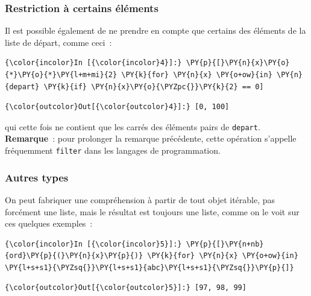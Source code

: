     \hypertarget{restriction-uxe0-certains-uxe9luxe9ments}{%
\subsubsection{Restriction à certains
éléments}\label{restriction-uxe0-certains-uxe9luxe9ments}}

    Il est possible également de ne prendre en compte que certains des
éléments de la liste de départ, comme ceci~:

    \begin{Verbatim}[commandchars=\\\{\}]
{\color{incolor}In [{\color{incolor}4}]:} \PY{p}{[}\PY{n}{x}\PY{o}{*}\PY{o}{*}\PY{l+m+mi}{2} \PY{k}{for} \PY{n}{x} \PY{o+ow}{in} \PY{n}{depart} \PY{k}{if} \PY{n}{x}\PY{o}{\PYZpc{}}\PY{k}{2} == 0]
\end{Verbatim}


\begin{Verbatim}[commandchars=\\\{\}]
{\color{outcolor}Out[{\color{outcolor}4}]:} [0, 100]
\end{Verbatim}
            
    qui cette fois ne contient que les carrés des éléments pairs de
\texttt{depart}.\\

    \textbf{Remarque}~: pour prolonger la remarque précédente, cette
opération s'appelle fréquemment \texttt{filter} dans les langages de
programmation.

    \hypertarget{autres-types}{%
\subsubsection{Autres types}\label{autres-types}}

    On peut fabriquer une compréhension à partir de tout objet itérable, pas
forcément une liste, mais le résultat est toujours une liste, comme on
le voit sur ces quelques exemples~:

    \begin{Verbatim}[commandchars=\\\{\}]
{\color{incolor}In [{\color{incolor}5}]:} \PY{p}{[}\PY{n+nb}{ord}\PY{p}{(}\PY{n}{x}\PY{p}{)} \PY{k}{for} \PY{n}{x} \PY{o+ow}{in} \PY{l+s+s1}{\PYZsq{}}\PY{l+s+s1}{abc}\PY{l+s+s1}{\PYZsq{}}\PY{p}{]}
\end{Verbatim}


\begin{Verbatim}[commandchars=\\\{\}]
{\color{outcolor}Out[{\color{outcolor}5}]:} [97, 98, 99]
\end{Verbatim}
            
